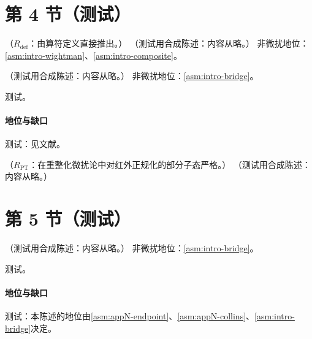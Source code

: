 \section{第 4 节（测试）}\label{sec:excl-endpoint}

\begin{proposition}\label{prop:excl-polynomiality}
（$R_{\mathrm{def}}$：由算符定义直接推出。）
（测试用合成陈述：内容从略。）
非微扰地位：\cref{asm:intro-wightman}、\cref{asm:intro-composite}。
\end{proposition}

\begin{theorem}\label{thm:excl-dvcs}
（测试用合成陈述：内容从略。）
非微扰地位：\cref{asm:intro-bridge}。
\end{theorem}
\begin{proofsketch}测试。\end{proofsketch}
\paragraph{地位与缺口}测试：见文献。

\begin{proposition}\label{prop:excl-dvcs-lo}
（$R_{\mathrm{PT}}$：在重整化微扰论中对红外正规化的部分子态严格。）
（测试用合成陈述：内容从略。）
\end{proposition}

\section{第 5 节（测试）}\label{sec:excl-gpd}

\begin{theorem}\label{thm:excl-meson-L}
（测试用合成陈述：内容从略。）
非微扰地位：\cref{asm:intro-bridge}。
\end{theorem}
\begin{proofsketch}测试。\end{proofsketch}
\paragraph{地位与缺口}测试：本陈述的地位由\cref{asm:appN-endpoint}、\cref{asm:appN-collins}、\cref{asm:intro-bridge}决定。

